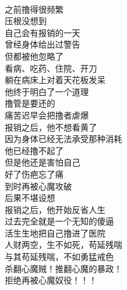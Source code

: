 \begin{poem}[报销之后]
    \begin{multicols}{3}
        \centering~\\
        之前撸得很频繁 \\ 压根没想到 \\ 自己会有报销的一天 \\ 曾经身体给出过警告 \\ 但都被他忽略了 \\ 看病、吃药、住院、开刀 \\ 躺在病床上对着天花板发呆 \\ 他终于明白了一个道理 \\ 撸管是要还的 \\ 痛苦迟早会把撸者虐爆 \\ 报销之后，他不想看黄了 \\ 因为身体已经无法承受那种消耗 \\ 他已经撸不起了 \\ 但是他还是害怕自己 \\ 好了伤疤忘了痛 \\ 到时再被心魔攻破 \\ 后果不堪设想 \\ 报销之后，他开始反省人生 \\ 过去完全就是一个无知的傻逼 \\ 活生生地把自己撸进了医院 \\ 人财两空，生不如死，苟延残喘 \\ 与其苟延残喘，不如勇猛戒色 \\ 杀翻心魔贼！推翻心魔的暴政！ \\ 拒绝再被心魔奴役！！！
    \end{multicols}
\end{poem}

